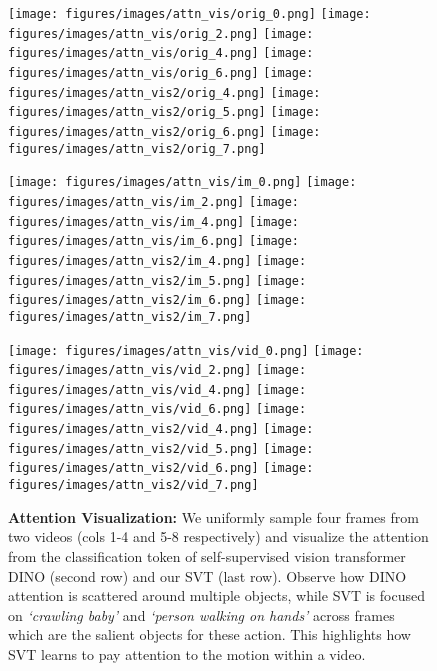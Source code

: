 \documentclass[10pt,twocolumn,letterpaper]{article}
\begin{document}
\newpage
\appendix


\setcounter{table}{0}
\setcounter{figure}{0}

\renewcommand{\thetable}{\Roman{table}}
\renewcommand{\thefigure}{\Roman{figure}}

\begin{figure*}[t]
	\centering
	\texttt{[image: figures/images/attn\_vis/orig\_0.png]}
	\texttt{[image: figures/images/attn\_vis/orig\_2.png]}
	\texttt{[image: figures/images/attn\_vis/orig\_4.png]}
	\texttt{[image: figures/images/attn\_vis/orig\_6.png]}
	\hspace{0.1em}
	\texttt{[image: figures/images/attn\_vis2/orig\_4.png]}
	\texttt{[image: figures/images/attn\_vis2/orig\_5.png]}
	\texttt{[image: figures/images/attn\_vis2/orig\_6.png]}
	\texttt{[image: figures/images/attn\_vis2/orig\_7.png]}
	
	
	
	\texttt{[image: figures/images/attn\_vis/im\_0.png]}
	\texttt{[image: figures/images/attn\_vis/im\_2.png]}
	\texttt{[image: figures/images/attn\_vis/im\_4.png]}
	\texttt{[image: figures/images/attn\_vis/im\_6.png]} \hspace{0.1em}
	\texttt{[image: figures/images/attn\_vis2/im\_4.png]}
	\texttt{[image: figures/images/attn\_vis2/im\_5.png]}
	\texttt{[image: figures/images/attn\_vis2/im\_6.png]}
	\texttt{[image: figures/images/attn\_vis2/im\_7.png]}
	
	\texttt{[image: figures/images/attn\_vis/vid\_0.png]}
	\texttt{[image: figures/images/attn\_vis/vid\_2.png]}
	\texttt{[image: figures/images/attn\_vis/vid\_4.png]}
	\texttt{[image: figures/images/attn\_vis/vid\_6.png]}
    \hspace{0.1em}
    \texttt{[image: figures/images/attn\_vis2/vid\_4.png]}
	\texttt{[image: figures/images/attn\_vis2/vid\_5.png]}
	\texttt{[image: figures/images/attn\_vis2/vid\_6.png]}
	\texttt{[image: figures/images/attn\_vis2/vid\_7.png]}
	
	\caption{\textbf{Attention Visualization:} We uniformly sample four frames from two videos (cols 1-4 and 5-8 respectively) and visualize the attention from the classification token of self-supervised vision transformer DINO \cite{caron2021emerging} (second row) and our SVT (last row). Observe how DINO attention is scattered around multiple objects, while 
	SVT is focused on \textit{`crawling baby'} and \textit{`person walking on hands'} across frames  which are the salient objects for these action. This highlights how SVT learns to pay attention to the motion within a video.
	}
	\label{fig:attn_vis}
\end{figure*}
\end{document}
